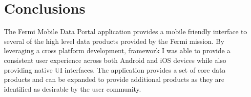 \section{Conclusions}
The Fermi Mobile Data Portal application provides a mobile friendly interface to several of the high level data products provided by the Fermi mission.  By leveraging a cross platform development, framework I was able to provide a consistent user experience across both Android and iOS devices while also providing native UI interfaces.  The application provides a set of core data products and can be expanded to provide additional products as they are identified as desirable by the user community.
